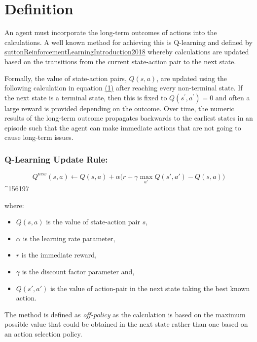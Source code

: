 \documentclass{article}
\title{}
\begin{document}
\maketitle
\section{Definition}
\label{loc:definition}
An agent must incorporate the long-term outcomes of actions into the calculations. A well known method for achieving this is Q-learning and defined by \hyperref[loc:references/books/suttonreinforcementlearningintroduction2018.statement]{suttonReinforcementLearningIntroduction2018} whereby calculations are updated based on the transitions from the current state-action pair to the next state.

Formally, the value of state-action pairs, $Q(s,a)$, are updated using the following calculation in equation \hyperref[loc:^156197]{(1)} after reaching every non-terminal state. If the next state is a terminal state, then this is fixed to $Q(s^\prime,a^\prime)=0$ and often a large reward is provided depending on the outcome. Over time, the numeric results of the long-term outcome propagates backwards to the earliest states in an episode such that the agent can make immediate actions that are not going to cause long-term issues. 
\subsubsection{Q-Learning Update Rule:}
\label{loc:definition.q:learning_update_rule:}
\begin{equation*}
\tag{1}
	Q^{new}(s,a)\leftarrow Q(s,a) + \alpha {\bigg (} r + \gamma \max_{a'}Q(s',a') - Q(s,a) {\bigg )}
\end{equation*}
^156197

where:
\begin{itemize}
\item $Q(s,a)$ is the value of state-action pair $s$,
\item $\alpha$ is the learning rate parameter,
\item $r$ is the immediate reward,
\item $\gamma$ is the discount factor parameter and,
\item $Q(s', a')$ is the value of action-pair in the next state taking the best known action.
\end{itemize}

The method is defined as \emph{off-policy} as the calculation is based on the maximum possible value that could be obtained in the next state rather than one based on an action selection policy. 
\printbibliography
\end{document}
